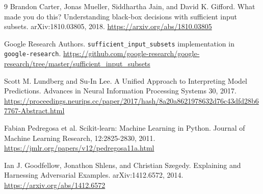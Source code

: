 \documentclass[11pt]{article}
\begin{document}
\begin{thebibliography}{9}
Brandon Carter, Jonas Mueller, Siddhartha Jain, and David K. Gifford.
\newblock What made you do this? Understanding black-box decisions with sufficient input subsets.
\newblock arXiv:1810.03805, 2018.
\newblock \url{https://arxiv.org/abs/1810.03805}

Google Research Authors.
\newblock \texttt{sufficient\_input\_subsets} implementation in \texttt{google-research}.
\newblock \url{https://github.com/google-research/google-research/tree/master/sufficient_input_subsets}

Scott M. Lundberg and Su-In Lee.
\newblock A Unified Approach to Interpreting Model Predictions.
\newblock Advances in Neural Information Processing Systems 30, 2017.
\newblock \url{https://proceedings.neurips.cc/paper/2017/hash/8a20a8621978632d76c43dfd28b67767-Abstract.html}

Fabian Pedregosa et al.
\newblock Scikit-learn: Machine Learning in Python.
\newblock Journal of Machine Learning Research, 12:2825-2830, 2011.
\newblock \url{https://jmlr.org/papers/v12/pedregosa11a.html}

Ian J. Goodfellow, Jonathon Shlens, and Christian Szegedy.
\newblock Explaining and Harnessing Adversarial Examples.
\newblock arXiv:1412.6572, 2014.
\newblock \url{https://arxiv.org/abs/1412.6572}
\end{thebibliography}
\end{document}
